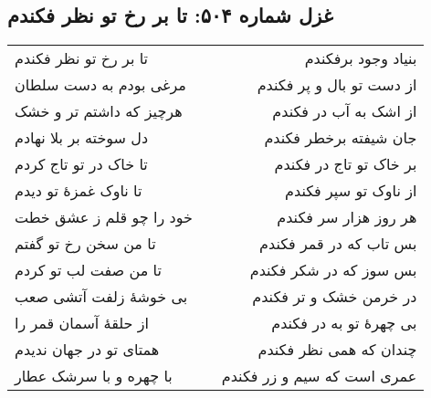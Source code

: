 \begin{center}
\section*{غزل شماره ۵۰۴: تا بر رخ تو نظر فکندم}
\label{sec:504}
\begin{longtable}{l p{0.5cm} r}
تا بر رخ تو نظر فکندم
&&
بنیاد وجود برفکندم
\\
مرغی بودم به دست سلطان
&&
از دست تو بال و پر فکندم
\\
هرچیز که داشتم تر و خشک
&&
از اشک به آب در فکندم
\\
دل سوخته بر بلا نهادم
&&
جان شیفته برخطر فکندم
\\
تا خاک در تو تاج کردم
&&
بر خاک تو تاج در فکندم
\\
تا ناوک غمزهٔ تو دیدم
&&
از ناوک تو سپر فکندم
\\
خود را چو قلم ز عشق خطت
&&
هر روز هزار سر فکندم
\\
تا من سخن رخ تو گفتم
&&
بس تاب که در قمر فکندم
\\
تا من صفت لب تو کردم
&&
بس سوز که در شکر فکندم
\\
بی خوشهٔ زلفت آتشی صعب
&&
در خرمن خشک و تر فکندم
\\
از حلقهٔ آسمان قمر را
&&
بی چهرهٔ تو به در فکندم
\\
همتای تو در جهان ندیدم
&&
چندان که همی نظر فکندم
\\
با چهره و با سرشک عطار
&&
عمری است که سیم و زر فکندم
\\
\end{longtable}
\end{center}
